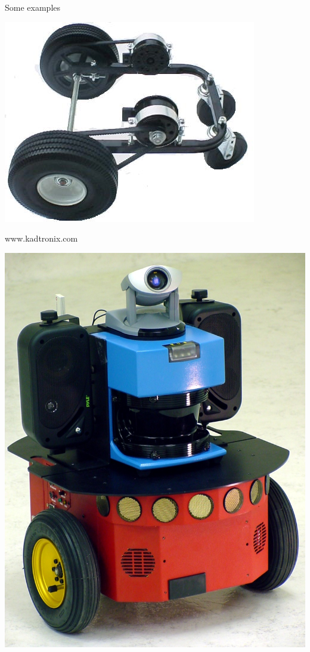 \documentclass[compress]{beamer}
\begin{document}
\begin{frame}{Some examples}

    \begin{center}
        \includegraphics[width=0.8\linewidth]{differentialdrive_ex1}
    \end{center}
www.kadtronix.com

    \begin{center}
        \includegraphics[width=0.8\linewidth]{differentialdrive_ex2}
    \end{center}


\end{frame}
\end{document}
